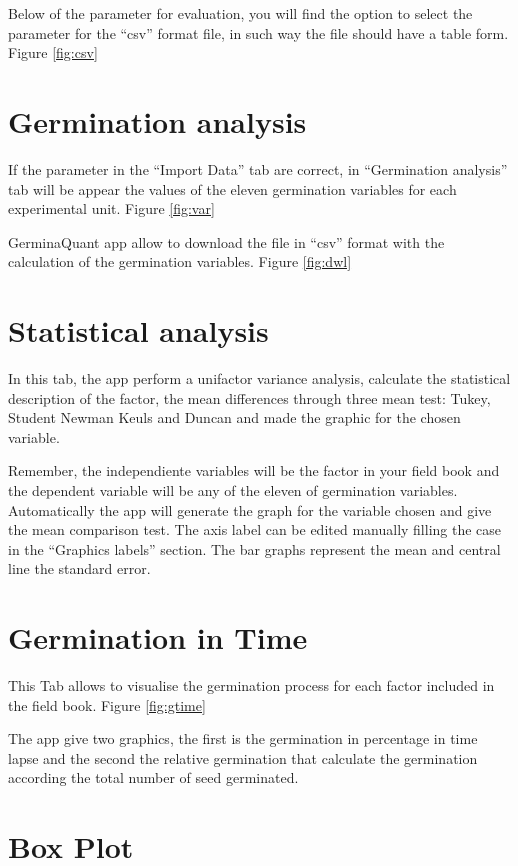 \documentclass[]{book}
\begin{document}
Below of the parameter for evaluation, you will find the option to
select the parameter for the ``csv'' format file, in such way the file
should have a table form. Figure \ref{fig:csv}

\section{Germination analysis}\label{germination-analysis-1}

If the parameter in the ``Import Data'' tab are correct, in
``Germination analysis'' tab will be appear the values of the eleven
germination variables for each experimental unit. Figure \ref{fig:var}

GerminaQuant app allow to download the file in ``csv'' format with the
calculation of the germination variables. Figure \ref{fig:dwl}

\section{Statistical analysis}\label{statistical-analysis}

In this tab, the app perform a unifactor variance analysis, calculate
the statistical description of the factor, the mean differences through
three mean test: Tukey, Student Newman Keuls and Duncan and made the
graphic for the chosen variable.

Remember, the independiente variables will be the factor in your field
book and the dependent variable will be any of the eleven of germination
variables. Automatically the app will generate the graph for the
variable chosen and give the mean comparison test. The axis label can be
edited manually filling the case in the ``Graphics labels'' section. The
bar graphs represent the mean and central line the standard error.

\section{Germination in Time}\label{germination-in-time}

This Tab allows to visualise the germination process for each factor
included in the field book. Figure \ref{fig:gtime}

The app give two graphics, the first is the germination in percentage in
time lapse and the second the relative germination that calculate the
germination according the total number of seed germinated.

\section{Box Plot}\label{box-plot}
\end{document}
